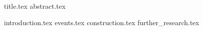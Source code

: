 \documentclass[11pt]{llncs}
\begin{document}
{title.tex}
\thispagestyle{plain}
{abstract.tex}

{introduction.tex}
{events.tex}
{construction.tex}
{further_research.tex}



\end{document}
